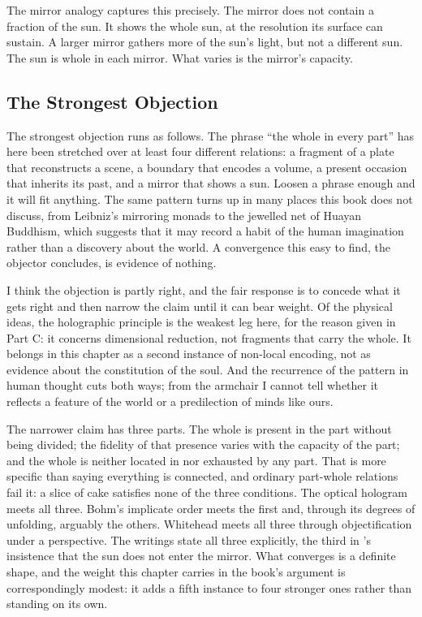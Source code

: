 The \bahai mirror analogy captures this precisely.
The mirror does not contain a fraction of the sun.
It shows the whole sun, at the resolution its surface can sustain.
A larger mirror gathers more of the sun's light, but not a different sun.
The sun is whole in each mirror.
What varies is the mirror's capacity.

\subsection*{The Strongest Objection}

The strongest objection runs as follows.
The phrase ``the whole in every part'' has here been stretched over at least four different relations: a fragment of a plate that reconstructs a scene, a boundary that encodes a volume, a present occasion that inherits its past, and a mirror that shows a sun.
Loosen a phrase enough and it will fit anything.
The same pattern turns up in many places this book does not discuss, from Leibniz's mirroring monads to the jewelled net of Huayan Buddhism, which suggests that it may record a habit of the human imagination rather than a discovery about the world.
A convergence this easy to find, the objector concludes, is evidence of nothing.

I think the objection is partly right, and the fair response is to concede what it gets right and then narrow the claim until it can bear weight.
Of the physical ideas, the holographic principle is the weakest leg here, for the reason given in Part C: it concerns dimensional reduction, not fragments that carry the whole.
It belongs in this chapter as a second instance of non-local encoding, not as evidence about the constitution of the soul.
And the recurrence of the pattern in human thought cuts both ways; from the armchair I cannot tell whether it reflects a feature of the world or a predilection of minds like ours.

The narrower claim has three parts.
The whole is present in the part without being divided; the fidelity of that presence varies with the capacity of the part; and the whole is neither located in nor exhausted by any part.
That is more specific than saying everything is connected, and ordinary part-whole relations fail it: a slice of cake satisfies none of the three conditions.
The optical hologram meets all three.
Bohm's implicate order meets the first and, through its degrees of unfolding, arguably the others.
Whitehead meets all three through objectification under a perspective.
The \bahai writings state all three explicitly, the third in \AbdulBaha's insistence that the sun does not enter the mirror.
What converges is a definite shape, and the weight this chapter carries in the book's argument is correspondingly modest: it adds a fifth instance to four stronger ones rather than standing on its own.

